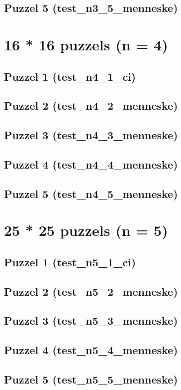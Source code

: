\documentclass[]{report}
\begin{document}
\begin{appendices}
\subsection{Puzzel 5 (test\_n3\_5\_menneske)}
\section{16 * 16 puzzels (n = 4)}
\subsection{Puzzel 1 (test\_n4\_1\_ci)}

\subsection{Puzzel 2 (test\_n4\_2\_menneske)}
\subsection{Puzzel 3 (test\_n4\_3\_menneske)}
\subsection{Puzzel 4 (test\_n4\_4\_menneske)}
\subsection{Puzzel 5 (test\_n4\_5\_menneske)}
\section{25 * 25 puzzels (n = 5)}
\subsection{Puzzel 1 (test\_n5\_1\_ci)}

\subsection{Puzzel 2 (test\_n5\_2\_menneske)}
\subsection{Puzzel 3 (test\_n5\_3\_menneske)}
\subsection{Puzzel 4 (test\_n5\_4\_menneske)}
\subsection{Puzzel 5 (test\_n5\_5\_menneske)}


\end{appendices}
\end{document}
